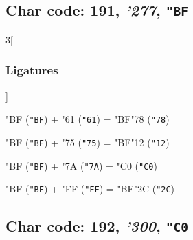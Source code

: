 \documentclass{article}
\newlength{\maxcharwidth}
\begin{document}
\subsection{Char code: 191, {\it'277}, {\tt"BF}}
\label{char_191}


\begin{multicols}{3}[\subsubsection{Ligatures}]

{\testfont\char"BF\noboundary} ({\tt"BF}) + {\testfont\char"61\noboundary} ({\tt"61}) = {\testfont\char"BF\noboundary}{\testfont\char"78\noboundary} ({\tt"78}) 

{\testfont\char"BF\noboundary} ({\tt"BF}) + {\testfont\char"75\noboundary} ({\tt"75}) = {\testfont\char"BF\noboundary}{\testfont\char"12\noboundary} ({\tt"12}) 

{\testfont\char"BF\noboundary} ({\tt"BF}) + {\testfont\char"7A\noboundary} ({\tt"7A}) = {\testfont\char"C0\noboundary} ({\tt"C0}) 

{\testfont\char"BF\noboundary} ({\tt"BF}) + {\testfont\char"FF\noboundary} ({\tt"FF}) = {\testfont\char"BF\noboundary}{\testfont\char"2C\noboundary} ({\tt"2C}) 

\end{multicols}

\subsection{Char code: 192, {\it'300}, {\tt"C0}}
\label{char_192}

\end{document}
